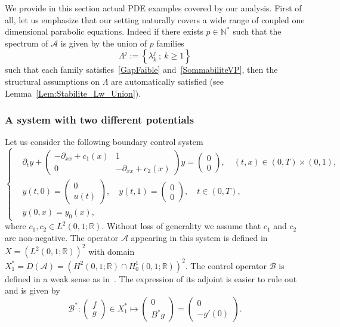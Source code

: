 \documentclass[AHL,Unicode,longabstracts]{cedram}
\newcommand\A{\mathcal{A}}
\newcommand\B{\mathcal{B}}
\newcommand\Bs{\mathcal{B}^*}
\newcommand{\Xuns}{X_1^*}
\newcommand{\N}{\mathbb{N}}
\newcommand{\R}{\mathbb{R}}
\begin{document}
We provide in this section actual PDE examples covered by our analysis. First of all, let us emphasize that our setting naturally covers a wide range of coupled one dimensional parabolic equations. Indeed if there exists $p \in \N^*$ such that the spectrum of $\A$ is given by the union of $p$ families
\[
\Lambda^j := \left\{ \lambda_k^j \: ; \: k \geq 1 \right\}
\]
such that each family satisfies~\eqref{GapFaible} and~\eqref{SommabiliteVP}, then the structural assumptions on $\Lambda$ are automatically satisfied (see Lemma~\ref{Lem:Stabilite_Lw_Union}).



\subsubsection{A system with two different potentials} \label{sec_two_potentials}
Let us consider the following boundary control system
\begin{equation}\label{systeme_en_c}
\begin{cases}
& \partial_t y +
\begin{pmatrix} - \partial_{xx} + c_1(x) & 1 \\ 0 & -\partial_{xx} + c_2(x)
\end{pmatrix} y =
\begin{pmatrix} 0 \\ 0
\end{pmatrix},
\quad (t,x) \in (0,T) \times (0,1),
\\[0.15em] 
&y(t,0) =
\begin{pmatrix} 0 \\ u(t)
\end{pmatrix}, \quad y(t,1) =
\begin{pmatrix} 0 \\ 0
\end{pmatrix}, \quad t\in (0,T),
\\[0.15em] 
&y(0,x) = y_0(x),
\end{cases}
\end{equation}
where $c_1,c_2\in L^2(0,1;\R)$. Without loss of generality we assume that $c_1$ and $c_2$ are non-negative. The operator $\A$ appearing in this system is defined in $X=(L^2(0,1 ; \R))^2$ with domain $\Xuns=D(\A)= \left(H^2(0,1 ; \R) \cap H^1_0 (0,1 ; \R) \right)^2$. The control operator $\B$ is defined in a weak sense as in~\cite{TucsnakWeissBook}. The expression of its adjoint is easier to rule out and is given by
\[
\Bs :
\begin{pmatrix} f \\ g
\end{pmatrix} \in \Xuns \mapsto
\begin{pmatrix} 0 \\ B^* g
\end{pmatrix} =
\begin{pmatrix} 0 \\ -g'(0)
\end{pmatrix}.
\]
\end{document}
